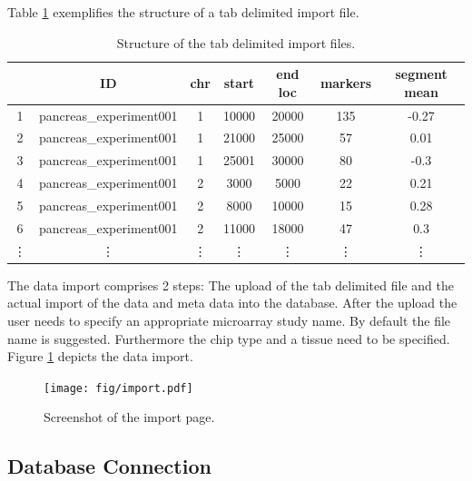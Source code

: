\documentclass[11pt,final]{article}
\newcommand{\FO}[0]{\emph{FISH Oracle}\xspace}
\begin{document}
Table \ref{tab:tsv} exemplifies the structure of a tab delimited import file.

\begin{table}
	\centering
	\begin{tabular}[h]{|c|c|c|c|c|c|c|}
	  \hline
	  & ID & chr & start & end loc & markers & segment mean \\ \hline
	 1 & pancreas\_experiment001 & 1 & 10000 & 20000 & 135 & -0.27 \\
	 2 & pancreas\_experiment001 & 1 & 21000 & 25000 & 57 & 0.01 \\
	 3 & pancreas\_experiment001 & 1 & 25001 & 30000 & 80 & -0.3 \\
	 4 & pancreas\_experiment001 & 2 & 3000 & 5000 & 22 & 0.21 \\
	 5 & pancreas\_experiment001 & 2 & 8000 & 10000 & 15 & 0.28 \\
	 6 & pancreas\_experiment001 & 2 & 11000 & 18000 & 47 & 0.3 \\
	 \vdots & \vdots & \vdots & \vdots & \vdots & \vdots & \vdots \\
	\end{tabular}
	\caption{Structure of the tab delimited import files.}
	\label{tab:tsv}
\end{table}

The data import comprises 2 steps: The upload of the tab delimited file and 
the actual import of the data and meta data into the database.
After the upload the user needs to specify an appropriate microarray study
name. By default the file name is suggested. Furthermore the chip type and a 
tissue need to be specified. Figure \ref{fig:import} depicts the data import.

\begin{figure}[h]
	\begin{center}
	  \texttt{[image: fig/import.pdf]}
	\end{center}
	\caption{Screenshot of the import page.}
	\label{fig:import}
\end{figure}


\subsection{Database Connection}
\end{document}
